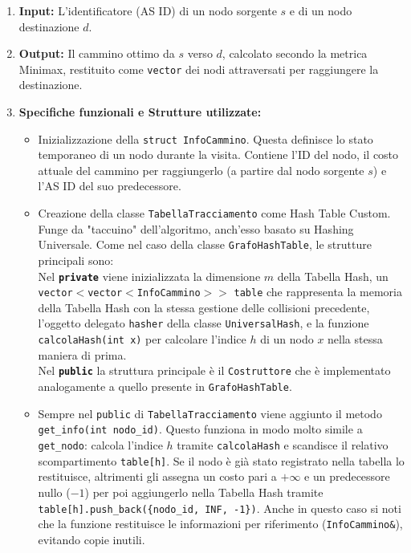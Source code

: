 \documentclass[12pt, a4paper]{article}
\begin{document}
\begin{enumerate}
    \item \textbf{Input:} L'identificatore (AS ID) di un nodo sorgente $s$ e di un nodo destinazione $d$. 
    \item \textbf{Output:} Il cammino ottimo da $s$ verso $d$, calcolato secondo la metrica Minimax, restituito come \texttt{vector} dei nodi attraversati per raggiungere la destinazione.
    \item \textbf{Specifiche funzionali e Strutture utilizzate:}
    \begin{itemize}
        \item[-] Inizializzazione della \texttt{struct InfoCammino}. Questa definisce lo stato temporaneo di un nodo durante la visita. Contiene l'ID del nodo, il costo attuale del cammino per raggiungerlo (a partire dal nodo sorgente $s$) e l'AS ID del suo predecessore.
        \item[-] Creazione della classe \texttt{TabellaTracciamento} come Hash Table Custom. Funge da "taccuino" dell'algoritmo, anch'esso basato su Hashing Universale. Come nel caso della classe \texttt{GrafoHashTable}, le strutture principali sono:\\
        Nel \textbf{\texttt{private}} viene inizializzata la dimensione $m$ della Tabella Hash, un \\ \texttt{vector$<$vector$<$InfoCammino$>$$>$} \texttt{table} che rappresenta la memoria della Tabella Hash con la stessa gestione delle collisioni precedente, l'oggetto delegato \texttt{hasher} della classe \texttt{UniversalHash}, e la funzione \texttt{calcolaHash(int x)} per calcolare l'indice $h$ di un nodo $x$ nella stessa maniera di prima.\\
        Nel \textbf{\texttt{public}} la struttura principale è il \texttt{Costruttore} che è implementato analogamente a quello presente in \texttt{GrafoHashTable}.
        \item[-] Sempre nel \texttt{public} di \texttt{TabellaTracciamento} viene aggiunto il metodo \texttt{get\_info(int nodo\_id)}. Questo funziona in modo molto simile a \texttt{get\_nodo}: calcola l'indice $h$ tramite \texttt{calcolaHash} e scandisce il relativo scompartimento \texttt{table[h]}. Se il nodo è già stato registrato nella tabella lo restituisce, altrimenti gli assegna un costo pari a $+\infty$ e un predecessore nullo ($-1$) per poi aggiungerlo nella Tabella Hash tramite \texttt{table[h].push\_back(\{nodo\_id, INF, -1\})}. Anche in questo caso si noti che la funzione restituisce le informazioni per riferimento (\texttt{InfoCammino\&}), evitando copie inutili.

\end{itemize}
\end{enumerate}
\end{document}
